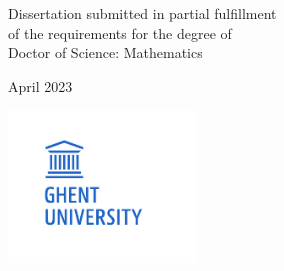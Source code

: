 \begin{titlepage}
    \vfill

    \begin{center}
        Dissertation submitted in partial fulfillment\\
        of the requirements for the degree of \\
        Doctor of Science: Mathematics

        \vspace{5mm}

        April 2023
    \end{center}

    \vspace{5mm}

    \begin{minipage}{5cm}
        \hspace{-1cm}\includegraphics[width=5cm]{img/logo_ugent.pdf}
    \end{minipage}%
    \hfill%

\end{titlepage}
\restoregeometry
